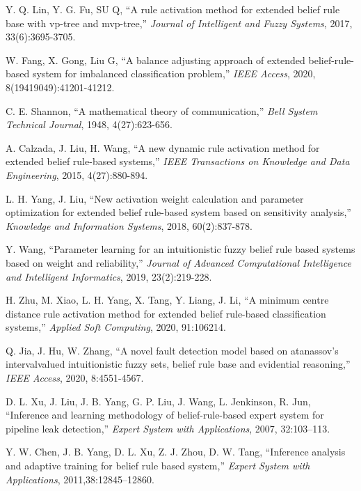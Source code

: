 \documentclass{ieeeaccess}
\begin{document}
\begin{thebibliography}{00}
     Y. Q. Lin, Y. G. Fu, SU Q, ``A rule activation method for extended belief rule base with vp-tree and mvp-tree,''
    \emph{Journal of Intelligent and Fuzzy Systems},
    2017, 33(6):3695-3705.

     W. Fang, X. Gong, Liu G, ``A balance adjusting approach of extended
    belief-rule-based system for imbalanced classification problem,''
    \emph{IEEE Access},
    2020, 8(19419049):41201-41212.

     C. E. Shannon, ``A mathematical theory of communication,''
    \emph{Bell System Technical Journal},
    1948, 4(27):623-656.

     A. Calzada, J. Liu, H. Wang, ``A new dynamic rule activation
    method for extended belief rule-based systems,''
    \emph{IEEE Transactions on Knowledge and Data Engineering},
    2015, 4(27):880-894.

     L. H. Yang, J. Liu, ``New activation weight calculation and parameter optimization
    for extended belief rule-based system based on sensitivity analysis,''
    \emph{Knowledge and Information Systems},
    2018, 60(2):837-878.

     Y. Wang, ``Parameter learning for an intuitionistic fuzzy belief rule based
    systems based on weight and reliability,''
    \emph{Journal of Advanced Computational Intelligence and Intelligent Informatics},
    2019, 23(2):219-228.

     H. Zhu, M. Xiao, L. H. Yang, X. Tang, Y. Liang, J. Li, ``A minimum centre distance rule activation method for extended
    belief rule-based classification systems,''
    \emph{Applied Soft Computing},
    2020, 91:106214.

     Q. Jia, J. Hu, W. Zhang, ``A novel fault detection model based on atanassov’s intervalvalued
    intuitionistic fuzzy sets, belief rule base and evidential reasoning,''
    \emph{IEEE Access}, 2020, 8:4551-4567.

     D. L. Xu, J. Liu, J. B. Yang, G. P. Liu, J. Wang, L. Jenkinson, R. Jun, ``Inference and learning methodology of belief-rule-based expert system for pipeline leak detection,''
    \emph{Expert System with Applications}, 2007, 32:103–113.

     Y. W. Chen, J. B. Yang, D. L. Xu, Z. J. Zhou, D. W. Tang, ``Inference analysis and adaptive training for belief rule based system,''
    \emph{Expert System with Applications}, 2011,38:12845–12860.


\end{thebibliography}
\end{document}
